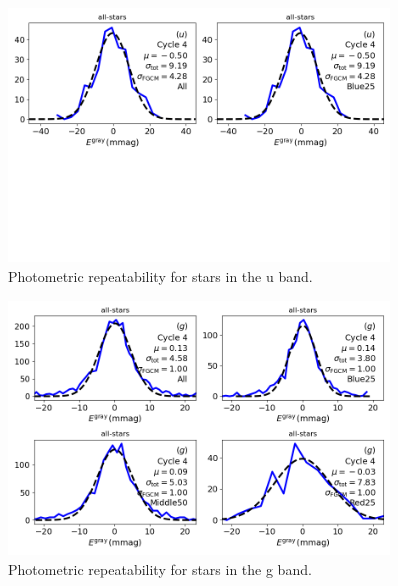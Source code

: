 \begin{figure}
  \begin{center}
    \includegraphics[width=0.9\textwidth]{photometric_calibration_figures/repeatability_u.png}
  \end{center}
  \caption{Photometric repeatability for stars in the u band.}
\end{figure}

\begin{figure}
  \begin{center}
    \includegraphics[width=0.9\textwidth]{photometric_calibration_figures/repeatability_g.png}
  \end{center}
  \caption{Photometric repeatability for stars in the g band.}
\end{figure}

